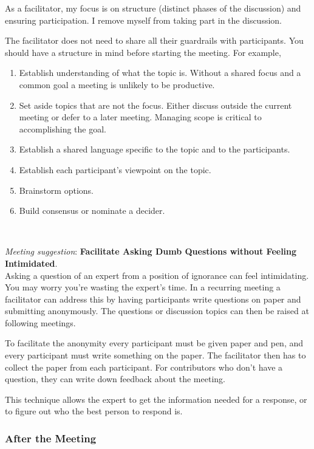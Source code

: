As a facilitator, my focus is on structure (distinct phases of the discussion) and ensuring participation. I remove myself from taking part in the discussion.

The facilitator does not need to share all their guardrails with participants. You should have a structure in mind before starting the meeting. For example,
\begin{enumerate}
    \item Establish understanding of what the topic is. Without a shared focus and a common goal a meeting is unlikely to be productive. 
    \item Set aside topics that are not the focus. Either discuss outside the current meeting or defer to a later meeting. Managing scope is critical to accomplishing the goal. 
    \item Establish a shared language specific to the topic and to the participants.
    \item Establish each participant's viewpoint on the topic.
    \item Brainstorm options.
    \item Build consensus or nominate a decider.
\end{enumerate}


\ \\
\begin{samepage}
\textit{Meeting suggestion}: \textbf{Facilitate Asking Dumb Questions without Feeling Intimidated}.\\
\nopagebreak %
Asking a question of an expert from a position of ignorance can feel intimidating. You may worry you're wasting the expert's time. In a recurring meeting a facilitator can address this by having participants write questions on paper and submitting anonymously. The questions or discussion topics can then be raised at following meetings. 
\end{samepage}

To facilitate the anonymity every participant must be given paper and pen, and every participant must write something on the paper. The facilitator then has to collect the paper from each participant. For contributors who don't have a question, they can write down feedback about the meeting. 

This technique allows the expert to get the information needed for a response, or to figure out who the best person to respond is. 

\subsubsection*{After the Meeting}

